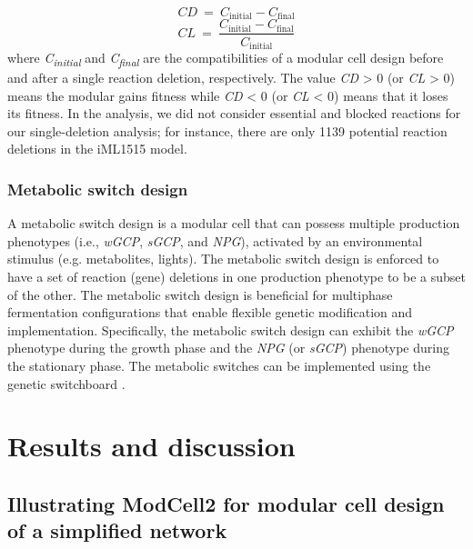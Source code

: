 \begin{equation}
CD\  = \ C_{\text{initial}} - C_{\text{final}}
\end{equation}
\begin{equation}
CL\  = \ \frac{C_{\text{initial}} - C_{\text{final}}}{C_{\text{initial}}}
\end{equation}
\noindent where \emph{C\textsubscript{initial}} and \emph{C\textsubscript{final}} are the compatibilities of a modular cell design before and after a single reaction deletion, respectively.
The value \emph{CD} \textgreater{} 0 (or \emph{CL} \textgreater{} 0) means the modular gains fitness while \emph{CD} \textless{} 0 (or \emph{CL} \textless{} 0) means that it loses its fitness.
In the analysis, we did not consider essential and blocked reactions for our single-deletion analysis; for instance, there are only 1139 potential reaction deletions in the iML1515 model.

\subsubsection{Metabolic switch design} A metabolic switch design is a
modular cell that can possess multiple production phenotypes (i.e.,
\emph{wGCP}, \emph{sGCP}, and \emph{NPG}), activated by an environmental
stimulus (e.g. metabolites, lights). The metabolic switch design is
enforced to have a set of reaction (gene) deletions in one production
phenotype to be a subset of the other.
The metabolic switch design is beneficial for multiphase fermentation
configurations that enable flexible genetic modification and
implementation. Specifically, the metabolic switch design can exhibit
the \emph{wGCP} phenotype during the growth phase and the \emph{NPG} (or
\emph{sGCP}) phenotype during the stationary phase. The metabolic
switches can be implemented using the genetic switchboard
\citep{callura2012}.

\section{Results and discussion}

\subsection{Illustrating ModCell2 for modular cell design of a simplified network}

